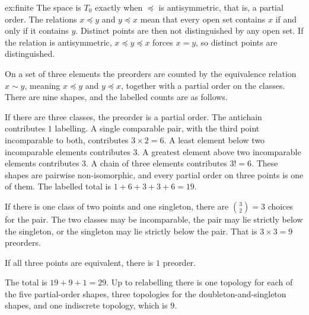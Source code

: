 \begin{solution}{ex:finite}
The space is $T_0$ exactly when $\preceq$ is antisymmetric, that is, a partial order. The relations $x\preceq y$ and $y\preceq x$ mean that every open set contains $x$ if and only if it contains $y$. Distinct points are then not distinguished by any open set. If the relation is antisymmetric, $x\preceq y\preceq x$ forces $x=y$, so distinct points are distinguished.

On a set of three elements the preorders are counted by the equivalence relation $x\sim y$, meaning $x\preceq y$ and $y\preceq x$, together with a partial order on the classes. There are nine shapes, and the labelled counts are as follows.

If there are three classes, the preorder is a partial order. The antichain contributes $1$ labelling. A single comparable pair, with the third point incomparable to both, contributes $3\times 2=6$. A least element below two incomparable elements contributes $3$. A greatest element above two incomparable elements contributes $3$. A chain of three elements contributes $3!=6$. These shapes are pairwise non-isomorphic, and every partial order on three points is one of them. The labelled total is $1+6+3+3+6=19$.

If there is one class of two points and one singleton, there are $\binom{3}{2}=3$ choices for the pair. The two classes may be incomparable, the pair may lie strictly below the singleton, or the singleton may lie strictly below the pair. That is $3\times 3=9$ preorders.

If all three points are equivalent, there is $1$ preorder.

The total is $19+9+1=29$. Up to relabelling there is one topology for each of the five partial-order shapes, three topologies for the doubleton-and-singleton shapes, and one indiscrete topology, which is $9$.
\end{solution}

